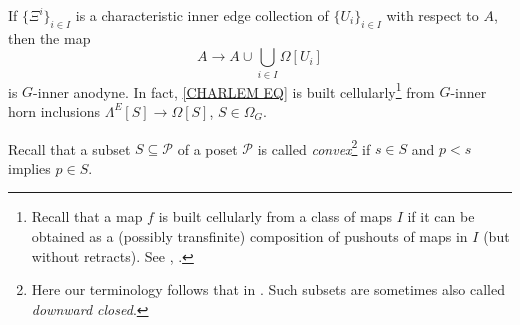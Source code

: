 \documentclass[a4paper,10pt
 ,draft
]{article}%
\begin{document}
\begin{lemma}\label{CHAREDGE LEM}
If $\{\Xi^i\}_{i \in I}$ is a characteristic inner edge collection of $\{U_i\}_{i\in I}$ with respect to $A$, then the map
	\begin{equation}\label{CHARLEM EQ}
		A \to A \cup \bigcup_{i \in I} \Omega[U_i]
	\end{equation}
is $G$-inner anodyne. 
In fact, \eqref{CHARLEM EQ} is built cellularly\footnote{Recall that a map $f$ is built cellularly from a class of maps $I$ if it can be obtained as a (possibly transfinite) composition of pushouts of maps in $I$ (but without retracts). See \cite[Def. 2.1.9]{Hov99},
\cite[Example 12.6.12]{Ri14}.
}
from $G$-inner horn inclusions $\Lambda^E[S] \to \Omega[S]$, $S \in \Omega_G$.
\end{lemma}

Recall that a subset $S \subseteq \mathcal{P}$ of a poset $\mathcal{P}$ is called \textit{convex}\footnote{Here our terminology follows that in \cite[\S 0]{Go91}. Such subsets are sometimes also called \textit{downward closed}.} if $s \in S$ and 
$p<s$ implies $p \in S$.
\end{document}
